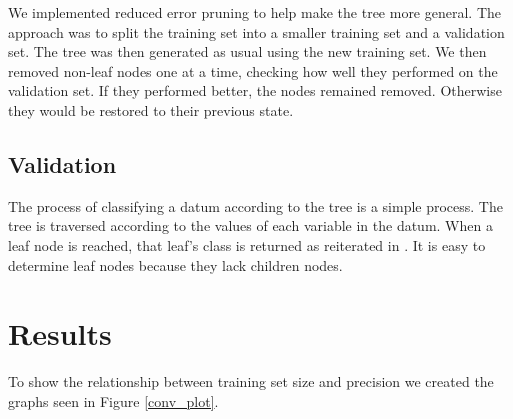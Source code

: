 \documentclass{article}
\begin{document}
	We implemented reduced error pruning to help make the tree more general. The approach was to split the training set into a smaller training set and a validation set. The tree was then generated as usual using the new training set. We then removed non-leaf nodes one at a time, checking how well they performed on the validation set. If they performed better, the nodes remained removed. Otherwise they would be restored to their previous state.
	\subsection{Validation}
	The process of classifying a datum according to the tree is a simple process. The tree is traversed according to the values of each variable in the datum. When a leaf node is reached, that leaf's class is returned as reiterated in \cite{Quinlan1986}. It is easy to determine leaf nodes because they lack children nodes.
	
\section{Results}
	To show the relationship between training set size and precision we created the graphs seen in Figure  \ref{conv_plot}.
\end{document}
